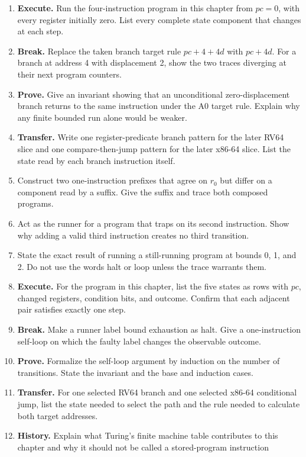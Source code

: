 \begin{enumerate}
\item \textbf{Execute.} Run the four-instruction program in this chapter from
\(pc=0\), with every register initially zero. List every complete state
component that changes at each step.
\item \textbf{Break.} Replace the taken branch target rule
\(pc+4+4d\) with \(pc+4d\). For a branch at address 4 with displacement 2,
show the two traces diverging at their next program counters.
\item \textbf{Prove.} Give an invariant showing that an unconditional
zero-displacement branch returns to the same instruction under the A0 target
rule. Explain why any finite bounded run alone would be weaker.
\item \textbf{Transfer.} Write one register-predicate branch pattern for the
later RV64 slice and one compare-then-jump pattern for the later x86-64 slice.
List the state read by each branch instruction itself.
\item Construct two one-instruction prefixes that agree on \(r_0\) but differ
on a component read by a suffix. Give the suffix and trace both composed
programs.
\item Act as the runner for a program that traps on its second instruction.
Show why adding a valid third instruction creates no third transition.
\item State the exact result of running a still-running program at bounds 0,
1, and 2. Do not use the words halt or loop unless the trace warrants them.
\item \textbf{Execute.} For the program in this chapter, list the five states
as rows with \(pc\), changed registers, condition bits, and outcome. Confirm
that each adjacent pair satisfies exactly one step.
\item \textbf{Break.} Make a runner label bound exhaustion as halt. Give a
one-instruction self-loop on which the faulty label changes the observable
outcome.
\item \textbf{Prove.} Formalize the self-loop argument by induction on the
number of transitions. State the invariant and the base and induction cases.
\item \textbf{Transfer.} For one selected RV64 branch and one selected x86-64
conditional jump, list the state needed to select the path and the rule needed
to calculate both target addresses.
\item \textbf{History.} Explain what Turing's finite machine table contributes
to this chapter and why it should not be called a stored-program instruction

\end{enumerate}
